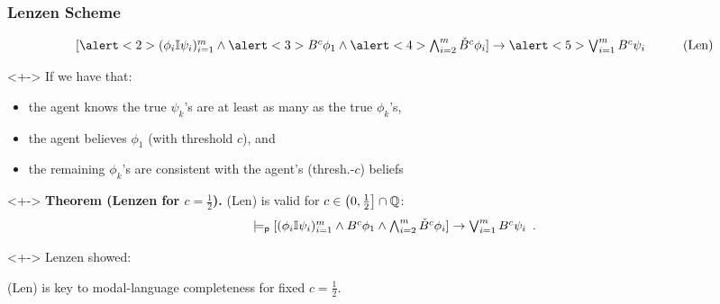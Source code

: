 \begin{frame}
  \frametitle{Lenzen Scheme}
  \[
  \begin{array}{cl}
    \textstyle [
    \alert<2>{(\phi_i\mathbb{I}\psi_i)_{i=1}^m}
    \land 
    \alert<3>{B^{c} \phi_1} 
    \land 
    \alert<4>{\bigwedge_{i=2}^m \check B^{c} \phi_i}
    ] \to
    \alert<5>{\bigvee_{i=1}^m B^{c}\psi_i}
    &
    \qquad\text{(Len)}
  \end{array}
  \]
  \begin{uncoverenv}<+->
    If we have that:
    \begin{itemize}
    \item<+-> the agent knows the true $\psi_k$'s are at least as many
      as the true $\phi_k$'s,
      
    \item<+-> the agent believes $\phi_1$ (with threshold $c$), and
      
    \item<+-> the remaining $\phi_k$'s are consistent with the agent's
      (thresh.-$c$) beliefs
    \end{itemize}
  \end{uncoverenv}

  \begin{myboxy}<+-> \textbf{Theorem (Lenzen for $c=\frac 12$).} (Len)
    is valid for $c\in\left(0,\frac 12\right]\cap\mathbb{Q}$:
    \[
    \textstyle \models_{\mathsf{p}} [(\phi_i\mathbb{I}\psi_i)_{i=1}^m \land
    B^c\phi_1 \land \bigwedge_{i=2}^m \check B^c\phi_i] \to
    \bigvee_{i=1}^m B^c\psi_i\enspace.
    \]
    \vspace{-1em}
  \end{myboxy}

  \begin{uncoverenv}<+-> Lenzen showed:
    \begin{center}
      (Len) is key to modal-language completeness for fixed $c=\frac
      12$.
    \end{center}
  \end{uncoverenv}
\end{frame}

